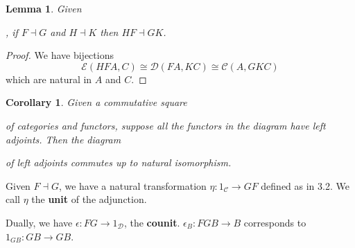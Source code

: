 \documentclass[a4paper]{article}
\newtheorem{lemma}[definition]{Lemma}
\newtheorem{corollary}[definition]{Corollary}
\numberwithin{definition}{section}
\begin{document}
\begin{lemma}
	Given
	,
	if $F \dashv G$ and $H \dashv K$ then $HF \dashv GK$.
\end{lemma}
\begin{proof}
	We have bijections
	$$\mathcal{E}(HFA, C) \cong \mathcal{D}(FA, KC) \cong \mathcal{C}(A, GKC)$$
	which are natural in $A$ and $C$.
\end{proof}

\begin{corollary}
	Given a commutative square
	of categories and functors,
	suppose all the functors in the diagram have left adjoints.
	Then the diagram
	of left adjoints commutes up to natural isomorphism.
\end{corollary}

Given $F \dashv G$,
we have a natural transformation $\eta: 1_\mathcal{C} \to GF$
defined as in 3.2. We call $\eta$ the \textbf{unit} of the adjunction.

Dually, we have $\epsilon: FG \to 1_\mathcal{D}$, the \textbf{counit}.
$\epsilon_B: FGB \to B$ corresponds to $1_{GB}: GB \to GB$.
\end{document}
